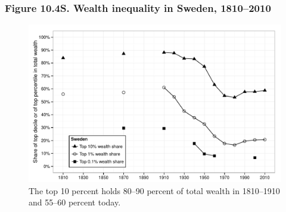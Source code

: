 \documentclass[t]{beamer}\usepackage[]{graphicx}\usepackage[]{color}
\newenvironment{knitrout}{}{} %
\begin{document}
\begin{frame}[label=Figure_10_4S]
\frametitle{Figure 10.4S. Wealth inequality in Sweden, 1810--2010}
\begin{figure}[t]
\begin{minipage}[b]{\textwidth}
\centering
\begin{knitrout}\footnotesize
{}\color{fgcolor}

{\centering \includegraphics[width=1\linewidth]{figures/bw/Figure_10_4S} 

}



\end{knitrout}
\caption{The top 10 percent holds 80--90 percent of total wealth in 1810--1910 and 55--60 percent today.}
\end{minipage}
\end{figure}
\end{frame}
\end{document}
